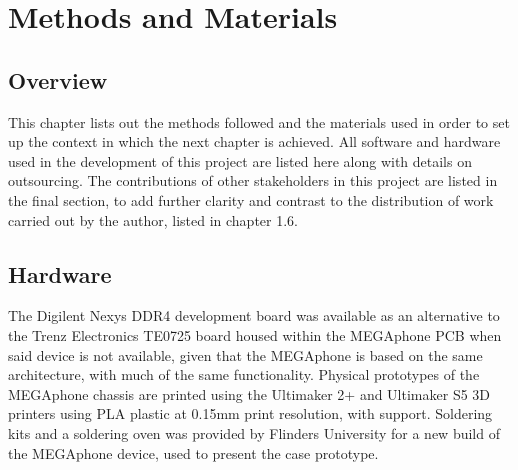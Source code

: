 
\chapter{Methods and Materials} %

\label{Chapter3} %


\section{Overview}
This chapter lists out the methods followed and the materials used in order to set up the context in which the next chapter is achieved.
All software and hardware used in the development of this project are listed here along with details on outsourcing.
The contributions of other stakeholders in this project are listed in the final section, to add further clarity and contrast to the distribution of work carried out by the author, listed in chapter 1.6.


\section{Hardware}

The Digilent Nexys DDR4 development board was available as an alternative to the Trenz Electronics TE0725 board housed within the MEGAphone PCB when said device is not available, given that the MEGAphone is based on the same architecture, with much of the same functionality.
Physical prototypes of the MEGAphone chassis are printed using the Ultimaker 2+ and Ultimaker S5 3D printers using PLA plastic at 0.15mm print resolution, with support.
Soldering kits and a soldering oven was provided by Flinders University for a new build of the MEGAphone device, used to present the case prototype.


